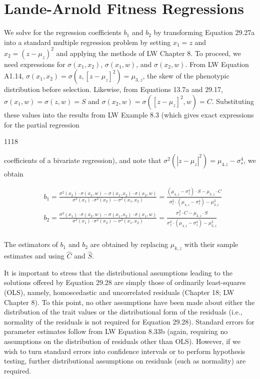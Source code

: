 \documentclass{article}
\begin{document}
\section{Lande-Arnold Fitness Regressions}
We solve for the regression coefficients  $ b_1 $ and  $ b_2 $ by transforming Equation 29.27a into a standard multiple regression problem by setting  $ x_1 = z $ and  $ x_2 = (z - \mu_z)^2 $ and applying the methods of LW Chapter 8. To proceed, we need expressions for  $ \sigma(x_1, x_2) $,  $ \sigma(x_1, w) $, and  $ \sigma(x_2, w) $. From LW Equation A1.14,  $ \sigma(x_1, x_2) = \sigma(z, [z - \mu_z]^2) = \mu_{3,z} $, the skew of the phenotypic distribution before selection. Likewise, from Equations 13.7a and 29.17,  $ \sigma(x_1, w) = \sigma(z, w) = S $ and  $ \sigma(x_2, w) = \sigma([z - \mu_z]^2, w) = C $. Substituting these values into the results from LW Example 8.3 (which gives exact expressions for the partial regression

1118

coefficients of a bivariate regression), and note that  $ \sigma^{2}(|z-\mu_{z}|^{2})=\mu_{4.z}-\sigma_{s}^{4} $, we obtain

\begin{equation}
\begin{aligned}&b_{1}=\frac{\sigma^{2}(x_{2})\cdot\sigma(x_{1},w)-\sigma(x_{1},x_{2})\cdot\sigma(x_{2},w)}{\sigma^{2}(x_{1})\cdot\sigma^{2}(x_{2})-\sigma^{2}(x_{1},x_{2})}=\frac{(\mu_{4,z}-\sigma_{z}^{4})\cdot S-\mu_{3,z}\cdot C}{\sigma_{z}^{2}\cdot(\mu_{4,z}-\sigma_{z}^{4})-\mu_{3,z}^{2}}\\ &b_{2}=\frac{\sigma^{2}(x_{1})\cdot\sigma(x_{2},w)-\sigma(x_{1},x_{2})\cdot\sigma(x_{1},w)}{\sigma^{2}(x_{1})\cdot\sigma^{2}(x_{2})-\sigma^{2}(x_{1},x_{2})}=\frac{\sigma_{z}^{2}\cdot C-\mu_{3,z}\cdot S}{\sigma_{z}^{2}\cdot(\mu_{4,z}-\sigma_{z}^{4})-\mu_{3,z}^{2}}\\ \end{aligned}
\tag{29.28a}
\label{eq:29_28a}
\end{equation}

The estimators of  $ b_1 $ and  $ b_2 $ are obtained by replacing  $ \mu_{k,z} $ with their sample estimates and using  $ \widehat{C} $ and  $ \widehat{S} $.

It is important to stress that the distributional assumptions leading to the solutions offered by Equation 29.28 are simply those of ordinarily least-squares (OLS), namely, homoscedastic and uncorrelated residuals (Chapter 18; LW Chapter 8). To this point, no other assumptions have been made about either the distribution of the trait values or the distributional form of the residuals (i.e., normality of the residuals is not required for Equation 29.28). Standard errors for parameter estimates follow from LW Equation 8.33b (again, requiring no assumptions on the distribution of residuals other than OLS). However, if we wish to turn standard errors into confidence intervals or to perform hypothesis testing, further distributional assumptions on residuals (such as normality) are required.
\end{document}
